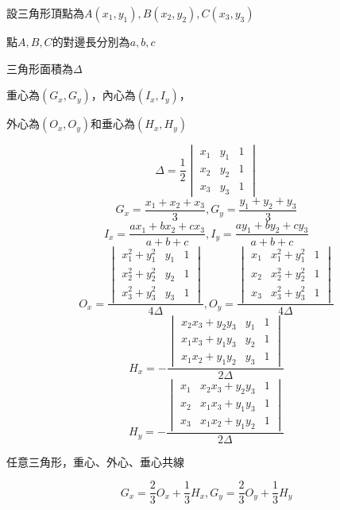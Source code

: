設三角形頂點為$A(x_1, y_1), B(x_2, y_2), C(x_3, y_3)$ \par
點$A, B, C$的對邊長分別為$a, b, c$ \par
三角形面積為$\Delta$ \par
重心為$(G_x, G_y)$，內心為$(I_x, I_y)$， \par
外心為$(O_x, O_y)$和垂心為$(H_x, H_y)$ \par
\[
    \Delta = \frac{1}{2}
    \begin{vmatrix}
        x_1 & y_1 & 1\\
        x_2 & y_2 & 1\\
        x_3 & y_3 & 1
    \end{vmatrix}
\]
\[
    G_x = \frac{x_1+x_2+x_3}{3}, G_y = \frac{y_1+y_2+y_3}{3}
\]
\[
    I_x = \frac{ax_1+bx_2+cx_3}{a+b+c}, I_y = \frac{ay_1+by_2+cy_3}{a+b+c}
\]
\[
    O_x = \frac{\begin{vmatrix}
        x_1^2+y_1^2 & y_1 & 1\\
        x_2^2+y_2^2 & y_2 & 1\\
        x_3^2+y_3^2 & y_3 & 1
      \end{vmatrix}}{4\Delta},
    O_y = \frac{\begin{vmatrix}
        x_1 & x_1^2+y_1^2 & 1\\
        x_2 & x_2^2+y_2^2 & 1\\
        x_3 & x_3^2+y_3^2 & 1
      \end{vmatrix}}{4\Delta}
\]
\[
    H_x = -\frac{\begin{vmatrix}
        x_2x_3+y_2y_3 & y_1 & 1\\
        x_1x_3+y_1y_3 & y_2 & 1\\
        x_1x_2+y_1y_2 & y_3 & 1
      \end{vmatrix}}{2\Delta}
\]
\[
    H_y = -\frac{\begin{vmatrix}
        x_1 & x_2x_3+y_2y_3 & 1\\
        x_2 & x_1x_3+y_1y_3 & 1\\
        x_3 & x_1x_2+y_1y_2 & 1
      \end{vmatrix}}{2\Delta}
\]

任意三角形，重心、外心、垂心共線 \par
\[
      G_x = \frac{2}{3}O_x+\frac{1}{3}H_x, 
      G_y = \frac{2}{3}O_y+\frac{1}{3}H_y
\]